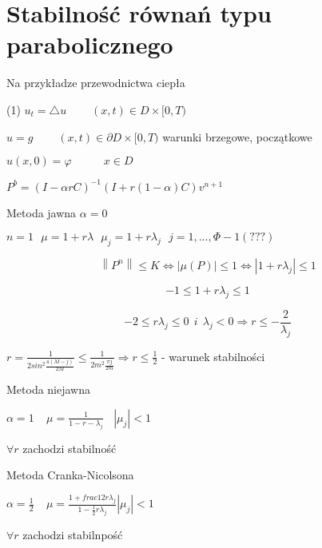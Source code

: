 \section{Stabilność równań typu parabolicznego}

Na przykładze przewodnictwa ciepła

(1) $u_t = \bigtriangleup u\ \ \ \ \ \ \ \ \ \ (x,t) \in D \times [0,T)$

$u = g\ \ \ \ \ \ \ \ \ \ (x,t) \in \partial D \times [0,T)$ warunki brzegowe, początkowe

$u(x,0) = \varphi\ \ \ \ \ \ \ \ \ \ \ \ \ x \in D$

$P^b = (I - \alpha rC)^{-1}(I + r(1-\alpha)C)v^{n+1}$

Metoda jawna $\alpha = 0$

$n = 1\ \ \ \mu = 1 + r \lambda\ \ \ \mu _j = 1 + r \lambda _j \ \ \ j = 1,...,\Phi - 1 (???)$

\[ \left \| P^n \right \| \leqslant K \Leftrightarrow \left | \mu (P) \right | \leqslant 1 \Leftrightarrow \left | 1 + r\lambda _j \right | \leqslant 1 \]

\[-1 \leqslant 1 + r \lambda _j \leqslant 1\]

\[-2 \leqslant r \lambda _j \leqslant 0\ \ i\ \ \lambda _j < 0 \Rightarrow r \leqslant - \frac{2}{\lambda _j} \]

$r = \frac{1}{2 sin^2 \frac{4(M-j)}{2M}} \leqslant \frac{1}{2m^2 \frac{\pi j}{2m}} \Rightarrow r \leqslant \frac{1}{2}$ - warunek stabilności

Metoda niejawna

$\alpha = 1\ \ \ \ \ \mu = \frac{1}{1 - r - \lambda _j}\ \ \ \  \left | \mu _j \right | < 1$

$\forall r$ zachodzi stabilność

Metoda Cranka-Nicolsona

$\alpha = \frac{1}{2}\ \ \ \ \ \mu = \frac{1 + frac{1}{2}r \lambda _j}{1 - \frac{1}{2}r \lambda _j}  \left | \mu _j \right | < 1$

$\forall r$ zachodzi stabilnpość